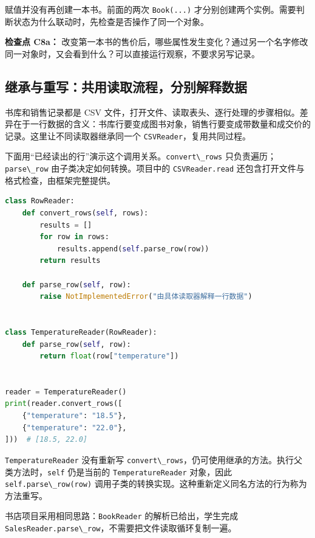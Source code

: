 \documentclass[UTF8,a4paper,11pt,fontset=fandol]{ctexart}
\providecommand{\passthrough}[1]{#1}
\begin{document}
赋值并没有再创建一本书。前面的两次 \passthrough{\lstinline!Book(...)!} 才分别创建两个实例。需要判断状态为什么联动时，先检查是否操作了同一个对象。

\textbf{检查点 C8a：} 改变第一本书的售价后，哪些属性发生变化？通过另一个名字修改同一对象时，又会看到什么？可以直接运行观察，不要求另写记录。

\clearpage

\subsection{继承与重写：共用读取流程，分别解释数据}\label{ux7ee7ux627fux4e0eux91cdux5199ux5171ux7528ux8bfbux53d6ux6d41ux7a0bux5206ux522bux89e3ux91caux6570ux636e}

书库和销售记录都是 CSV 文件，打开文件、读取表头、逐行处理的步骤相似。差异在于一行数据的含义：书库行要变成图书对象，销售行要变成带数量和成交价的记录。这里让不同读取器继承同一个 \passthrough{\lstinline!CSVReader!}，复用共同过程。

下面用``已经读出的行''演示这个调用关系。\passthrough{\lstinline!convert\_rows!} 只负责遍历；\passthrough{\lstinline!parse\_row!} 由子类决定如何转换。项目中的 \passthrough{\lstinline!CSVReader.read!} 还包含打开文件与格式检查，由框架完整提供。

\begin{lstlisting}[language=Python]
class RowReader:
    def convert_rows(self, rows):
        results = []
        for row in rows:
            results.append(self.parse_row(row))
        return results

    def parse_row(self, row):
        raise NotImplementedError("由具体读取器解释一行数据")


class TemperatureReader(RowReader):
    def parse_row(self, row):
        return float(row["temperature"])


reader = TemperatureReader()
print(reader.convert_rows([
    {"temperature": "18.5"},
    {"temperature": "22.0"},
]))  # [18.5, 22.0]
\end{lstlisting}

\passthrough{\lstinline!TemperatureReader!} 没有重新写 \passthrough{\lstinline!convert\_rows!}，仍可使用继承的方法。执行父类方法时，\passthrough{\lstinline!self!} 仍是当前的 \passthrough{\lstinline!TemperatureReader!} 对象，因此 \passthrough{\lstinline!self.parse\_row(row)!} 调用子类的转换实现。这种重新定义同名方法的行为称为方法重写。

书店项目采用相同思路：\passthrough{\lstinline!BookReader!} 的解析已给出，学生完成 \passthrough{\lstinline!SalesReader.parse\_row!}，不需要把文件读取循环复制一遍。
\end{document}
